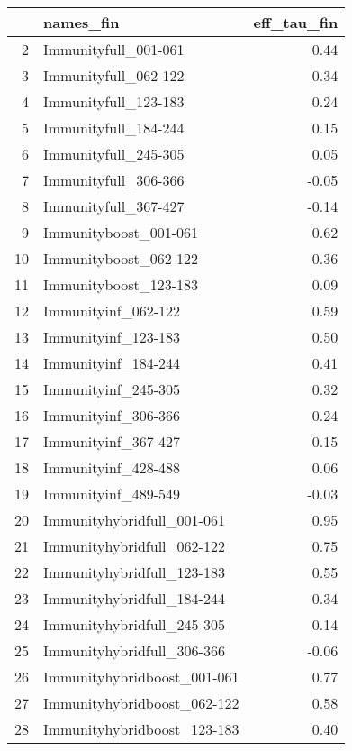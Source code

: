 \begin{table}[ht]
\centering
\begin{tabular}{rlr}
  \hline
 & names\_fin & eff\_tau\_fin \\ 
  \hline
2 & Immunityfull\_001-061 & 0.44 \\ 
  3 & Immunityfull\_062-122 & 0.34 \\ 
  4 & Immunityfull\_123-183 & 0.24 \\ 
  5 & Immunityfull\_184-244 & 0.15 \\ 
  6 & Immunityfull\_245-305 & 0.05 \\ 
  7 & Immunityfull\_306-366 & -0.05 \\ 
  8 & Immunityfull\_367-427 & -0.14 \\ 
  9 & Immunityboost\_001-061 & 0.62 \\ 
  10 & Immunityboost\_062-122 & 0.36 \\ 
  11 & Immunityboost\_123-183 & 0.09 \\ 
  12 & Immunityinf\_062-122 & 0.59 \\ 
  13 & Immunityinf\_123-183 & 0.50 \\ 
  14 & Immunityinf\_184-244 & 0.41 \\ 
  15 & Immunityinf\_245-305 & 0.32 \\ 
  16 & Immunityinf\_306-366 & 0.24 \\ 
  17 & Immunityinf\_367-427 & 0.15 \\ 
  18 & Immunityinf\_428-488 & 0.06 \\ 
  19 & Immunityinf\_489-549 & -0.03 \\ 
  20 & Immunityhybridfull\_001-061 & 0.95 \\ 
  21 & Immunityhybridfull\_062-122 & 0.75 \\ 
  22 & Immunityhybridfull\_123-183 & 0.55 \\ 
  23 & Immunityhybridfull\_184-244 & 0.34 \\ 
  24 & Immunityhybridfull\_245-305 & 0.14 \\ 
  25 & Immunityhybridfull\_306-366 & -0.06 \\ 
  26 & Immunityhybridboost\_001-061 & 0.77 \\ 
  27 & Immunityhybridboost\_062-122 & 0.58 \\ 
  28 & Immunityhybridboost\_123-183 & 0.40 \\ 
   \hline
\end{tabular}
\end{table}
